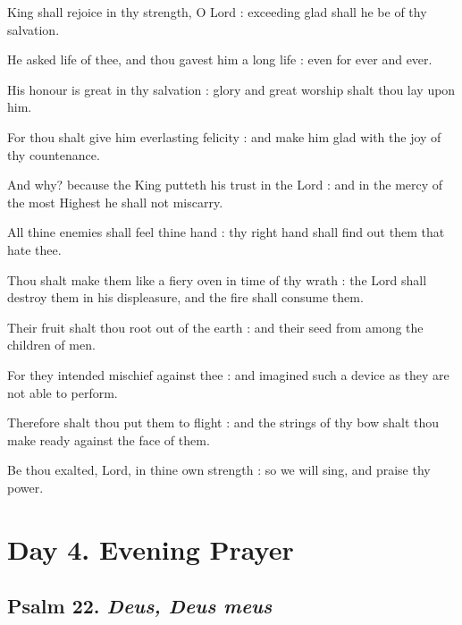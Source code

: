  King shall rejoice in thy strength, O Lord : exceeding glad shall he be of thy salvation.\par
{}
He asked life of thee, and thou gavest him a long life : even for ever and ever.\par
{}His honour is great in thy salvation : glory and great worship shalt thou lay upon him.\par
{}For thou shalt give him everlasting felicity : and make him glad with the joy of thy countenance.\par
{}And why? because the King putteth his trust in the Lord : and in the mercy of the most Highest he shall not miscarry.\par
{}All thine enemies shall feel thine hand : thy right hand shall find out them that hate thee.\par
{}Thou shalt make them like a fiery oven in time of thy wrath : the Lord shall destroy them in his displeasure, and the fire shall consume them.\par
{}Their fruit shalt thou root out of the earth : and their seed from among the children of men.\par
{}For they intended mischief against thee : and imagined such a device as they are not able to perform.\par
{}Therefore shalt thou put them to flight : and the strings of thy bow shalt thou make ready against the face of them.\par
{}Be thou exalted, Lord, in thine own strength : so we will sing, and praise thy power.\par

\section*{Day 4. Evening Prayer}

\subsection{Psalm 22. \textit{Deus, Deus meus}}


